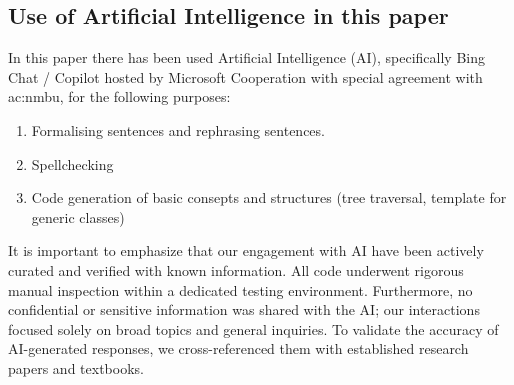 \subsection[Use of AI]{Use of Artificial Intelligence in this paper}

In this paper there has been used Artificial Intelligence (AI), specifically Bing Chat / Copilot hosted by Microsoft Cooperation with special agreement with \acrfull{ac:nmbu}, for the following purposes:

\begin{enumerate}
	\item Formalising sentences and rephrasing sentences.
	\item Spellchecking
	\item Code generation of basic consepts and structures (tree traversal, template for generic classes) 
\end{enumerate}

It is important to emphasize that our engagement with AI have been actively curated and verified with known information. All code underwent rigorous manual inspection within a dedicated testing environment. Furthermore, no confidential or sensitive information was shared with the AI; our interactions focused solely on broad topics and general inquiries. To validate the accuracy of AI-generated responses, we cross-referenced them with established research papers and textbooks.
\label{pg:LastBread}